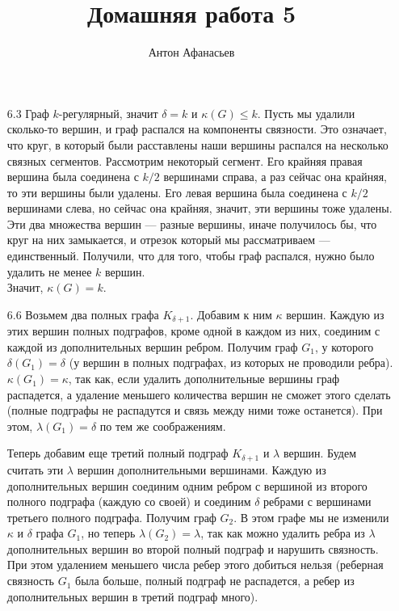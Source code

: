 \documentclass[10pt]{article}
\renewcommand{\leq}{\leqslant}
\begin{document}
\title{Домашняя работа 5}
\author{Антон Афанасьев}
\maketitle

\begin{enumerate}
\item[6.3] Граф $k$-регулярный, значит $\delta = k$ и $\kappa(G) \leq k$. Пусть мы удалили сколько-то вершин, и граф распался на компоненты связности. Это означает, что круг, в который были расставлены наши вершины распался на несколько связных сегментов. Рассмотрим некоторый сегмент. Его крайняя правая вершина была соединена с $k/2$ вершинами справа, а раз сейчас она крайняя, то эти вершины были удалены. Его левая вершина была соединена с $k/2$ вершинами слева, но сейчас она крайняя, значит, эти вершины тоже удалены. Эти два множества вершин --- разные вершины, иначе получилось бы, что круг на них замыкается, и отрезок который мы рассматриваем --- единственный. Получили, что для того, чтобы граф распался, нужно было удалить не менее $k$ вершин.\\
Значит, $\kappa(G) = k$.

\item[6.6] Возьмем два полных графа $K_{\delta+1}$. Добавим к ним $\kappa$ вершин. Каждую из этих вершин полных подграфов, кроме одной в каждом из них, соединим с каждой из дополнительных вершин ребром. Получим граф $G_1$, у которого $\delta(G_1) = \delta$ (у вершин в полных подграфах, из которых не проводили ребра). $\kappa(G_1) = \kappa$, так как, если удалить дополнительные вершины граф распадется, а удаление меньшего количества вершин не сможет этого сделать (полные подграфы не распадутся и связь между ними тоже останется). При этом, $\lambda(G_1) = \delta$ по тем же соображениям.

Теперь добавим еще третий полный подграф $K_{\delta+1}$ и $\lambda$ вершин. Будем считать эти $\lambda$ вершин дополнительными вершинами. Каждую из дополнительных вершин соединим одним ребром с вершиной из второго полного подграфа (каждую со своей) и соединим $\delta$ ребрами с вершинами третьего полного подграфа. Получим граф $G_2$. В этом графе мы не изменили $\kappa$ и $\delta$ графа $G_1$, но теперь $\lambda(G_2) = \lambda$, так как можно удалить ребра из $\lambda$ дополнительных вершин во второй полный подграф и нарушить связность. При этом удалением меньшего числа ребер этого добиться нельзя (реберная связность $G_1$ была больше, полный подграф не распадется, а ребер из дополнительных вершин в третий подграф много).


\end{enumerate}
\end{document}
